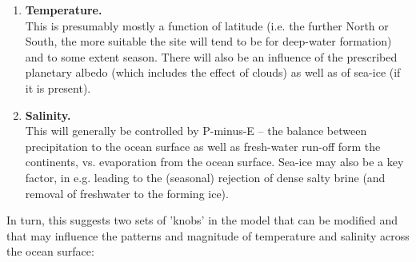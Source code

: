 \vspace{2mm}
\begin{enumerate}
\item \textbf{Temperature.}
\\This is presumably mostly a function of latitude (i.e. the further North or South, the more suitable the site will tend to be for deep-water formation) and to some extent season. There will also be an influence of the prescribed planetary albedo (which includes the effect of clouds) as well as of sea-ice (if it is present).
\vspace{2mm}
\item \textbf{Salinity.}
\\This will generally be controlled by P-minus-E -- the balance between precipitation to the ocean surface as well as fresh-water run-off form the continents, vs. evaporation from the ocean surface. Sea-ice may also be a key factor, in e.g. leading to the (seasonal) rejection of dense salty brine (and removal of freshwater to the forming ice).
\end{enumerate}
\vspace{2mm}

In turn, this suggests two sets of 'knobs' in the model that can be modified and that may influence the patterns and magnitude of temperature and salinity across the ocean surface:

